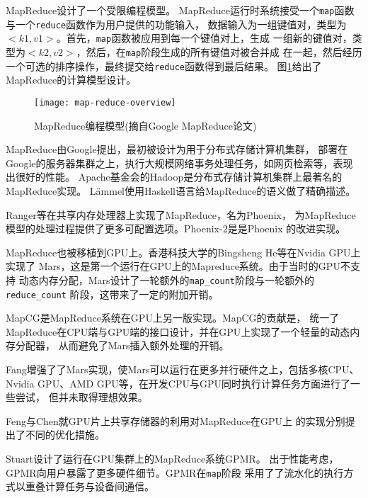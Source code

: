 MapReduce设计了一个受限编程模型。
MapReduce运行时系统接受一个\texttt{map}函数与一个\texttt{reduce}函数作为用户提供的功能输入，
数据输入为一组键值对，类型为$<k1, v1>$。首先，\texttt{map}函数被应用到每一个键值对上，生成
一组新的键值对，类型为$<k2, v2>$，然后，在\texttt{map}阶段生成的所有键值对被合并成
在一起，然后经历一个可选的排序操作，最终提交给\texttt{reduce}函数得到最后结果。
图\ref{fig:map-reduce-overview}给出了MapReduce的计算模型设计。
\begin{figure}
  \centering
  \texttt{[image: map-reduce-overview]}
  \caption[MapReduce编程模型]{MapReduce编程模型(摘自Google MapReduce论文\cite{Dean2008})}
  \label{fig:map-reduce-overview}
\end{figure}

MapReduce由Google提出，最初被设计为用于分布式存储计算机集群，
部署在Google的服务器集群之上，执行大规模网络事务处理任务，如网页检索等，表现出很好的性能。
Apache基金会的Hadoop是分布式存储计算机集群上最著名的MapReduce实现。
L\"ammel使用Haskell语言给MapReduce的语义做了精确描述。

Ranger等在共享内存处理器上实现了MapReduce，名为Phoenix，
为MapReduce模型的处理过程提供了更多可配置选项。Phoenix-2是是Phoenix
的改进实现。

MapReduce也被移植到GPU上。香港科技大学的Bingsheng He等在Nvidia GPU上实现了
Mars，这是第一个运行在GPU上的Mapreduce系统。由于当时的GPU不支持
动态内存分配，Mars设计了一轮额外的\texttt{map\_count}阶段与一轮额外的\texttt{reduce\_count}
阶段，这带来了一定的附加开销。

MapCG是MapReduce系统在GPU上另一版实现。MapCG的贡献是，
统一了MapReduce在CPU端与GPU端的接口设计，并在GPU上实现了一个轻量的动态内存分配器，
从而避免了Mars插入额外处理的开销。

Fang增强了了Mars实现，使Mars可以运行在更多并行硬件之上，包括多核CPU、
Nvidia GPU、AMD GPU等，在开发CPU与GPU同时执行计算任务方面进行了一些尝试，
但并未取得理想效果。

Feng与Chen就GPU片上共享存储器的利用对MapReduce在GPU上
的实现分别提出了不同的优化措施。

Stuart设计了运行在GPU集群上的MapReduce系统GPMR。
出于性能考虑，GPMR向用户暴露了更多硬件细节。GPMR在\texttt{map}阶段
采用了了流水化的执行方式以重叠计算任务与设备间通信。


